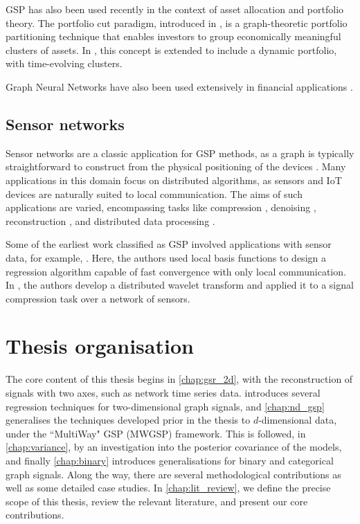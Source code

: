 GSP has also been used recently in the context of asset allocation and portfolio theory. The portfolio cut paradigm, introduced in \citep{Dees2020}, is a graph-theoretic portfolio partitioning technique that enables investors to group economically meaningful clusters of assets. In \citep{Arroyo2022}, this concept is extended to include a dynamic portfolio, with time-evolving clusters.

Graph Neural Networks have also been used extensively in financial applications \citep{Wang2022c}. 


\subsection{Sensor networks}

Sensor networks are a classic application for GSP methods, as a graph is typically straightforward to construct from the physical positioning of the devices \citep{Jablonski2017}. Many applications in this domain focus on distributed algorithms, as sensors and IoT devices are naturally suited to local communication. The aims of such applications are varied, encompassing tasks like compression \citep{Zhu2012}, denoising \citep{Tay2021}, reconstruction \citep{Wang2015}, and distributed data processing \citep{Chi2022}.

Some of the earliest work classified as GSP involved applications with sensor data, for example, \cite{Guestrin2004}. Here, the authors used local basis functions to design a regression algorithm capable of fast convergence with only local communication. In \cite{Wagner2005}, the authors develop a distributed wavelet transform and applied it to a signal compression task over a network of sensors. 

\section{Thesis organisation}

The core content of this thesis begins in \cref{chap:gsr_2d}, with the reconstruction of signals with two axes, such as network time series data.  introduces several regression techniques for two-dimensional graph signals, and \cref{chap:nd_gsp} generalises the techniques developed prior in the thesis to $d$-dimensional data, under the ``MultiWay" GSP (MWGSP) framework. This is followed, in \cref{chap:variance}, by an investigation into the posterior covariance of the models, and finally \cref{chap:binary} introduces generalisations for binary and categorical graph signals. Along the way, there are several methodological contributions as well as some detailed case studies. In \cref{chap:lit_review}, we define the precise scope of this thesis, review the relevant literature, and present our core contributions. 
